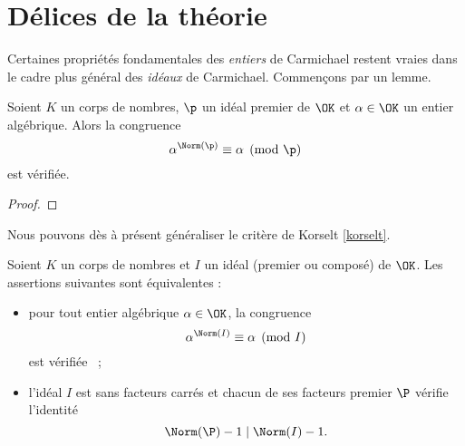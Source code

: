 \section{Délices de la théorie}

Certaines propriétés fondamentales des \emph{entiers} de Carmichael restent vraies dans le cadre plus général des \emph{idéaux} de Carmichael. Commençons par un lemme.

\begin{lemme}\label{identite-1}
	Soient $K$ un corps de nombres, $\p$ un idéal premier de $\OK$ et $\alpha \in \OK$ un entier algébrique. Alors la congruence \[\alpha^{\Norm(\p)} \equiv \alpha \pmod{\p}\] est vérifiée.
\end{lemme}

\begin{proof}
\end{proof}

Nous pouvons dès à présent généraliser le critère de Korselt \ref{korselt}.

\begin{theoreme}\label{korselt-generalise}
	Soient $K$ un corps de nombres et $I$ un idéal (premier ou composé) de $\OK$. Les assertions suivantes sont équivalentes :
	\begin{itemize}
		\item pour tout entier algébrique $\alpha \in \OK$, la congruence \[\alpha^{\Norm(I)} \equiv \alpha \pmod{I}\] est vérifiée ~;
		\item l'idéal $I$ est sans facteurs carrés et chacun de ses facteurs premier $\P$ vérifie l'identité \[\Norm(\P) - 1 \mid \Norm(I) - 1.\]
	\end{itemize}
\end{theoreme}

